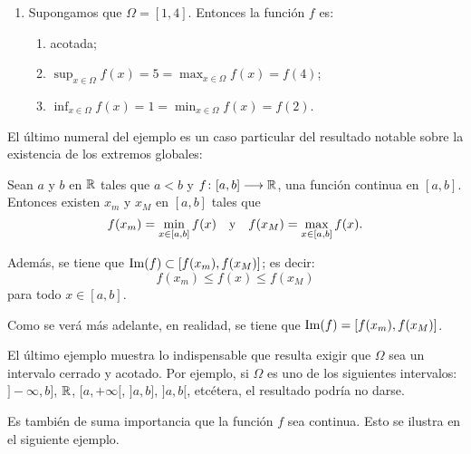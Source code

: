 \begin{exemplo}[]{}
\begin{enumerate}[leftmargin=*]
\item Supongamos que $\Omega = [1,4]$. Entonces la función $f$ es:
    \begin{enumerate}[leftmargin=*]
    \item acotada;
    \item $\displaystyle\sup_{x\in\Omega} f(x) = 5 = \max_{x\in\Omega} f(x) = f(4)$;
    \item $\displaystyle\inf_{x\in\Omega} f(x) = 1 = \min_{x\in\Omega} f(x) = f(2)$.
    \end{enumerate}
\end{enumerate}
\end{exemplo}

El último numeral del ejemplo es un caso particular del resultado notable sobre la existencia de
los extremos globales:

\begin{teocal}\label{teo:daExistenciaExtremosGlobales} Sean $a$ y $b$ en $\mathbb{R}$ tales que $a < b$ y
$f\colon [a,b]\longrightarrow \mathbb{R}$, una función continua en $[a,b]$. Entonces existen $x_m$ y $x_M$ en
$[a,b]$ tales que
\[
f(x_m) = \min_{x\in [a,b]} f(x) \quad\text{y}\quad f(x_M) = \max_{x\in [a,b]} f(x).
\]

Además, se tiene que $\operatorname{Im}(f) \subset [f(x_m),f(x_M)]$; es decir:
\[
f(x_m) \leq f(x) \leq f(x_M)
\]
para todo $x\in [a,b]$.
\end{teocal}

Como se verá más adelante, en realidad, se tiene que $\operatorname{Im}(f) = [f(x_m),f(x_M)]$.

El último ejemplo muestra lo indispensable que resulta exigir que $\Omega$ sea un intervalo cerrado
y acotado. Por ejemplo, si $\Omega$ es uno de los siguientes intervalos: $]-\infty,b]$, $\mathbb{R}$,
$[a,+\infty[$, $]a,b]$, $]a,b[$, etcétera, el resultado podría no darse.

Es también de suma importancia que la función $f$ sea continua. Esto se ilustra en el siguiente
ejemplo.

